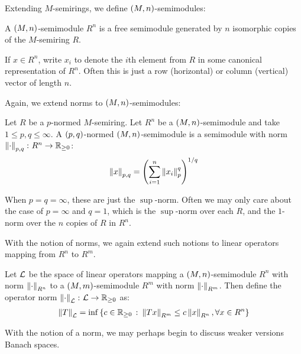 Extending \(M\)-semirings,
we define \(\left(M, n\right)\)-semimodules:

\begin{definition}
  A \(\left(M, n\right)\)-semimodule \(R ^n\)
  is a free semimodule generated by \(n\) isomorphic copies of
  the \(M\)-semiring \(R\).
\end{definition}

If \(x \in R ^n\), write \(x_i\) to denote the \(i\)th element from
\(R\) in some canonical representation of \(R ^n\).
Often this is just a row (horizontal) or column (vertical)
vector of length \(n\).

Again, we extend norms to \(\left(M, n\right)\)-semimodules:

\begin{definition}
  Let \(R\) be a \(p\)-normed \(M\)-semiring.
  Let \(R ^n\) be a \(\left(M, n\right)\)-semimodule
  and take \(1 \leq p, q \leq \infty\).
  A \(\left(p, q\right)\)-normed \(\left(M, n\right)\)-semimodule
  is a semimodule with norm \(\left\lVert\cdot\right\rVert_{p, q} \colon R^n \to \mathbb{R}_{\geq 0}\):
  \begin{align*}
    \left\lVert x\right\rVert_{p, q}
      = \left(\sum_{i = 1}^{n} \left\lVert x_i\right\rVert_{p}^q\right)^{1 / q}
  \end{align*}
\end{definition}

When \(p = q = \infty\), these are just the \(\sup\)-norm.
Often we may only care about the case of \(p = \infty\) and \(q = 1\),
which is the \(\sup\)-norm over each \(R\),
and the \(1\)-norm over the \(n\) copies of \(R\) in \(R^n\).

With the notion of norms, we again extend such notions to
linear operators mapping from \(R^n\) to \(R^m\).

\begin{definition}
  Let \(\mathcal{L}\) be the space of linear operators mapping
  a \(\left(M, n\right)\)-semimodule \(R^n\) with norm \(\left\lVert\cdot\right\rVert_{R^n}\)
  to a \(\left(M, m\right)\)-semimodule \(R^m\) with norm \(\left\lVert\cdot\right\rVert_{R^m}\).
  Then define the operator norm
  \(\left\lVert\cdot\right\rVert_{\mathcal{L}} \colon \mathcal{L} \to \mathbb{R}_{\geq 0}\) as:
  \begin{align*}
    \left\lVert T\right\rVert_{\mathcal{L}} =
      \inf \left\{c \in \mathbb{R}_{\geq 0} \ \colon
              \left\lVert Tx\right\rVert_{R^m}
                \leq c \left\lVert x\right\rVert_{R^n},
              \forall x \in R^n\right\}
  \end{align*}
\end{definition}

With the notion of a norm,
we may perhaps begin to discuss weaker versions Banach spaces.

